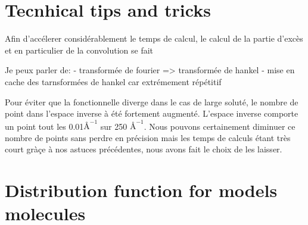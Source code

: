 \section{Tecnhical tips and tricks} \label{app:technical_tips_adn_tricks}
Afin d'accélerer considérablement le temps de calcul, le calcul de la partie d'excès et en particulier de la convolution se fait 

Je peux parler de:
- transformée de fourier => transformée de hankel
- mise en cache des tarnsformées de hankel car extrémement répétitif

Pour éviter que la fonctionnelle diverge dans le cas de large soluté, le nombre de point dans l'espace inverse à été fortement augmenté. L'espace inverse comporte un point tout les 0.01$\text{\AA}^{-1}$ sur 250 $\text{\AA}^{-1}$. Nous pouvons certainement diminuer ce nombre de points sans perdre en précision mais les temps de calculs étant très court gràçe à nos astuces précédentes, nous avons fait le choix de les laisser.





\section{Distribution function for models molecules} \label{app:g_of_r}


